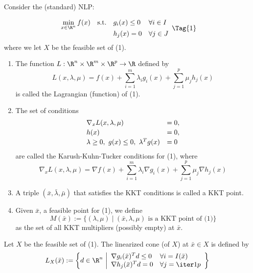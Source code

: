 \label{b38093d}

Consider the (standard) NLP:

\begin{equation*}
  \NlpStdForm
  \Tag{1}
\end{equation*}
where we let $X$ be the feasible set of (1).

\begin{enumerate}
  \item The function $L:\R^n\times\R^m\times\R^p\to\R$ defined by
        $$
          L(x,\lambda,\mu)=f(x)+\sum_{i=1}^m\lambda_ig_i(x)+\sum_{j=1}^p\mu_jh_j(x)
        $$
        is called the Lagrangian (function) of (1).
  \item The set of conditions
        $$
          \begin{array}{l l}
            \nabla_xL(x,\lambda,\mu)                 & =0, \\[0.2em]
            h(x)                                     & =0, \\[0.2em]
            \lambda\geq0,\ g(x)\leq0,\ \lambda^Tg(x) & =0
          \end{array}
        $$
        are called the Karush-Kuhn-Tucker conditions for (1), where
        $$
          \nabla_xL(x,\lambda,\mu)=\nabla f(x)+\sum_{i=1}^m\lambda_i\nabla g_i(x)+\sum_{j=1}^p\mu_j\nabla h_j(x)
        $$
  \item A triple $(\bar x,\bar\lambda,\bar\mu)$ that satisfies the KKT conditions is
        called a KKT point.
  \item Given $\bar x$, a feasible point for (1), we define
        $$
          M(\bar x):=\{(\lambda,\mu)\mid(\bar x,\lambda,\mu)\text{ is a KKT point of (1)}\}
        $$
        as the set of all KKT multipliers (possibly empty) at $\bar x$.
\end{enumerate}

\label{ca4f471}

Let $X$ be the feasible set of (1). The linearized cone (of $X$) at $\bar x\in
X$ is defined by
$$
  L_X(\bar x):=\left\{ d\in\R^n\ \middle\vert
  \begin{array}{l l}
    \nabla g_i(\bar x)^Td\leq0 & \forall i=I(\bar x) \\
    \nabla h_j(\bar x)^Td=0    & \forall j=\iter1p
  \end{array}
  \right\}
$$

\label{adc266e}

